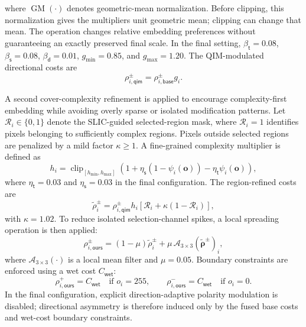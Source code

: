\documentclass[journal]{IEEEtran}
\theoremstyle{definition}
\theoremstyle{game}
\begin{document}
where $\operatorname{GM}(\cdot)$ denotes geometric-mean normalization. Before clipping, this normalization gives the multipliers unit geometric
mean; clipping can change that mean. The operation changes relative
embedding preferences without guaranteeing an exactly preserved final scale. In the final setting, $\beta_{\mathsf{t}}=0.08$, $\beta_{\mathsf{s}}=0.08$, $\beta_{\mathsf{d}}=0.01$, $g_{\min}=0.85$, and $g_{\max}=1.20$. The QIM-modulated directional costs are
\begin{equation}
    \rho_{i,\mathsf{qim}}^{\pm}
    =
    \rho_{i,\mathsf{base}}^{\pm} g_i .
    \label{eq:qim_modulated_cost}
\end{equation}

A second cover-complexity refinement is applied to encourage complexity-first embedding while avoiding overly sparse or isolated modification patterns. Let $\mathcal{R}_i\in\{0,1\}$ denote the SLIC-guided selected-region mask, where $\mathcal{R}_i=1$ identifies pixels belonging to sufficiently complex regions. Pixels outside selected regions are penalized by a mild factor $\kappa\geq 1$. A fine-grained complexity multiplier is defined as
\begin{equation}
    h_i
    =
    \operatorname{clip}_{[h_{\min},h_{\max}]}
    \left(
    1+\eta_{\mathsf{s}}(1-\psi_i(\mathbf{o}))
    -\eta_{\mathsf{t}}\psi_i(\mathbf{o})
    \right),
    \label{eq:qim_fine_complexity_factor}
\end{equation}
where $\eta_{\mathsf{t}}=0.03$ and $\eta_{\mathsf{s}}=0.03$ in the final configuration. The region-refined costs are
\begin{equation}
    \widetilde{\rho}_{i}^{\pm}
    =
    \rho_{i,\mathsf{qim}}^{\pm}
    h_i
    \left[
    \mathcal{R}_i+\kappa(1-\mathcal{R}_i)
    \right],
    \label{eq:qim_region_refined_cost}
\end{equation}
with $\kappa=1.02$. To reduce isolated selection-channel spikes, a local spreading operation is then applied:
\begin{equation}
    \rho_{i,\mathsf{ours}}^{\pm}
    =
    (1-\mu)\widetilde{\rho}_{i}^{\pm}
    +
    \mu\,
    \mathcal{A}_{3\times3}\!\left(\widetilde{\boldsymbol{\rho}}^{\pm}\right)_i,
    \label{eq:qim_spread_cost}
\end{equation}
where $\mathcal{A}_{3\times3}(\cdot)$ is a local mean filter and $\mu=0.05$. Boundary constraints are enforced using a wet cost $C_{\mathsf{wet}}$:
\begin{equation}
    \rho_{i,\mathsf{ours}}^{+}=C_{\mathsf{wet}}
    \quad\text{if } o_i=255,
    \qquad
    \rho_{i,\mathsf{ours}}^{-}=C_{\mathsf{wet}}
    \quad\text{if } o_i=0.
    \label{eq:qim_wet_cost}
\end{equation}
In the final configuration, explicit direction-adaptive polarity modulation is disabled; directional asymmetry is therefore induced only by the fused base costs and wet-cost boundary constraints.
\end{document}
